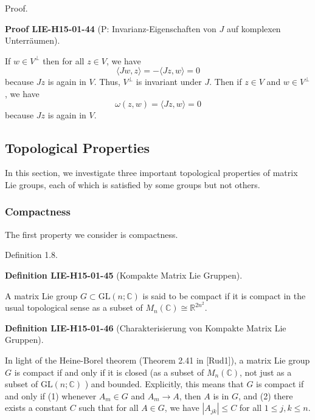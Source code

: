 \documentclass[10pt, letterpaper]{article}
\newcommand{\CustomHeading}[3]{%
  \par\medskip\noindent%
  \textbf{#1 #2} \textnormal{(#3)}.\enskip%
}
\newenvironment{DEF}[2]{\begin{unitbox}\CustomHeading{Definition}{#1}{#2}}{\end{unitbox}}
\newenvironment{PROOF}[2]{\begin{unitbox}\CustomHeading{Proof}{#1}{#2}}{\end{unitbox}}
\begin{document}
Proof. 

\begin{PROOF}{LIE-H15-01-44}{P: Invarianz-Eigenschaften von $J$ auf komplexen Unterräumen}
If $w \in V^{\perp}$ then for all $z \in V$, we have
$$
\langle J w, z\rangle=-\langle J z, w\rangle=0
$$
because $J z$ is again in $V$. Thus, $V^{\perp}$ is invariant under $J$. Then if $z \in V$ and $w \in V^{\perp}$, we have
$$
\omega(z, w)=\langle J z, w\rangle=0
$$
because $J z$ is again in $V$.
\end{PROOF}









\pagebreak




\subsection*{Topological Properties}
In this section, we investigate three important topological properties of matrix Lie groups, each of which is satisfied by some groups but not others.

\subsubsection*{Compactness}


The first property we consider is compactness.


Definition 1.8. 


\begin{DEF}{LIE-H15-01-45}{Kompakte Matrix Lie Gruppen}
A matrix Lie group $G \subset \mathrm{GL}(n ; \mathbb{C})$ is said to be compact if it is compact in the usual topological sense as a subset of $M_{n}(\mathbb{C}) \cong \mathbb{R}^{2 n^{2}}$.
\end{DEF}

\begin{DEF}{LIE-H15-01-46}{Charakterisierung von Kompakte Matrix Lie Gruppen}
In light of the Heine-Borel theorem (Theorem 2.41 in [Rud1]), a matrix Lie group $G$ is compact if and only if it is closed (as a subset of $M_{n}(\mathbb{C})$, not just as a subset of $\mathrm{GL}(n ; \mathbb{C})$ ) and bounded. Explicitly, this means that $G$ is compact if and only if (1) whenever $A_{m} \in G$ and $A_{m} \rightarrow A$, then $A$ is in $G$, and (2) there exists a constant $C$ such that for all $A \in G$, we have $\left|A_{j k}\right| \leq C$ for all $1 \leq j, k \leq n$.
\end{DEF}
\end{document}
